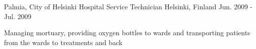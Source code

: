 \begin{cventries}
  \cventry
    {Palmia, City of Helsinki} %
    {Hospital Service Technician} %
    {Helsinki, Finland} %
    {Jun. 2009 - Jul. 2009} %
    {
      \begin{cvitems}
        \item {Managing mortuary, providing oxygen bottles to wards and transporting
        patients from the wards to treatments and back}
      \end{cvitems}
    }

\end{cventries}
